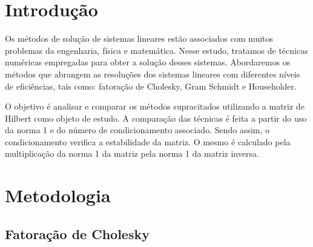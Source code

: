 \documentclass[12pt, a4paper]{article}
\begin{document}
\newpage

\section{Introdução}




Os métodos de solução de sistemas lineares estão associados com muitos problemas da engenharia, física e matemática. Nesse estudo, tratamos de técnicas numéricas empregadas para obter a solução desses sistemas. Abordaremos os métodos que abrangem as resoluções dos sistemas lineares com diferentes níveis de eficiências, tais como: fatoração de Cholesky, Gram Schmidt e Householder.

O objetivo é analisar e comparar os métodos supracitados utilizando a matriz de Hilbert como objeto de estudo. A comparação das técnicas é feita a partir do uso da norma 1 e do número de condicionamento associado. Sendo assim, o condicionamento verifica a estabilidade da matriz. O mesmo é calculado pela multiplicação da norma 1 da matriz pela norma 1 da matriz inversa.




\section{Metodologia}




\subsection{Fatoração de Cholesky}
\end{document}
